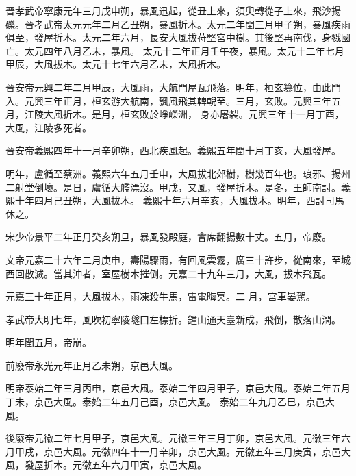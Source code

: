 \begin{pinyinscope}
 晉孝武帝寧康元年三月戊申朔，暴風迅起，從丑上來，須臾轉從子上來，飛沙揚礫。晉孝武帝太元元年二月乙丑朔，暴風折木。太元二年閏三月甲子朔，暴風疾雨俱至，發屋折木。太元二年六月，長安大風拔苻堅宮中樹。其後堅再南伐，身戮國亡。太元四年八月乙未，暴風。
 太元十二年正月壬午夜，暴風。太元十二年七月甲辰，大風拔木。太元十七年六月乙未，大風折木。



 晉安帝元興二年二月甲辰，大風雨，大航門屋瓦飛落。明年，桓玄篡位，由此門入。元興三年正月，桓玄游大航南，飄風飛其䡟輗至。三月，玄敗。元興三年五月，江陵大風折木。是月，桓玄敗於崢嶸洲，
 身亦屠裂。元興三年十一月丁酉，大風，江陵多死者。



 晉安帝義熙四年十一月辛卯朔，西北疾風起。義熙五年閏十月丁亥，大風發屋。



 明年，盧循至蔡洲。義熙六年五月壬申，大風拔北郊樹，樹幾百年也。琅邪、揚州二射堂倒壞。是日，盧循大艦漂沒。甲戌，又風，發屋折木。是冬，王師南討。義熙十年四月己丑朔，大風拔木。
 義熙十年六月辛亥，大風拔木。明年，西討司馬休之。



 宋少帝景平二年正月癸亥朔旦，暴風發殿庭，會席翻揚數十丈。五月，帝廢。



 文帝元嘉二十六年二月庚申，壽陽驟雨，有回風雲霧，廣三十許步，從南來，至城西回散滅。當其沖者，室屋樹木摧倒。元嘉二十九年三月，大風，拔木飛瓦。



 元嘉三十年正月，大風拔木，雨凍殺牛馬，雷電晦冥。二
 月，宮車晏駕。



 孝武帝大明七年，風吹初寧陵隧口左標折。鐘山通天臺新成，飛倒，散落山澗。



 明年閏五月，帝崩。



 前廢帝永光元年正月乙未朔，京邑大風。



 明帝泰始二年三月丙申，京邑大風。泰始二年四月甲子，京邑大風。泰始二年五月丁未，京邑大風。泰始二年五月己酉，京邑大風。
 泰始二年九月乙巳，京邑大風。



 後廢帝元徽二年七月甲子，京邑大風。元徽三年三月丁卯，京邑大風。元徽三年六月甲戌，京邑大風。元徽四年十一月辛卯，京邑大風。元徽五年三月庚寅，京邑大風，發屋折木。元徽五年六月甲寅，京邑大風。




\end{pinyinscope}

